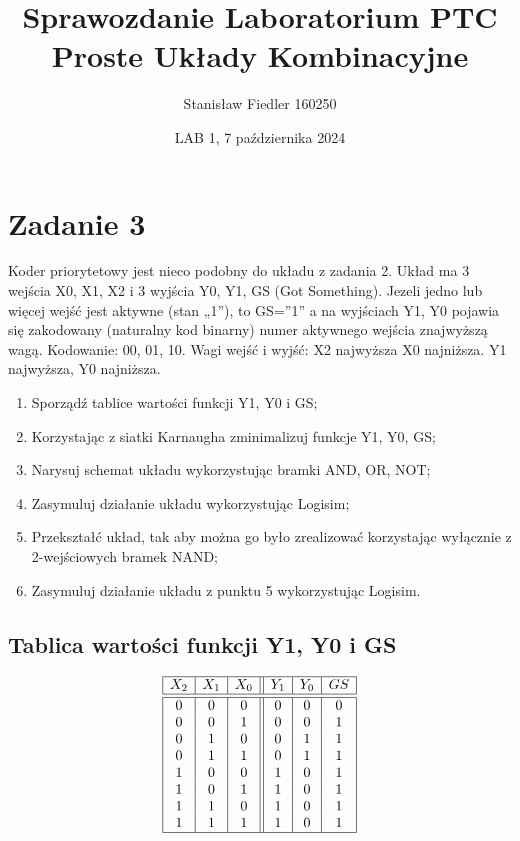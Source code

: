 \documentclass[a4paper, 11pt]{article}
\title{%
       \large Sprawozdanie Laboratorium PTC \\
       \huge Proste Układy Kombinacyjne}
\author{Stanisław Fiedler 160250}
\date{LAB 1, 7 października 2024}
\begin{document}
\maketitle
\tableofcontents

\section{Zadanie 3}
Koder priorytetowy jest nieco podobny do układu z zadania 2.
Układ ma 3 wejścia X0, X1, X2 i 3 wyjścia Y0, Y1, GS (Got Something).
Jezeli jedno lub więcej wejść jest aktywne (stan „1”), to GS=”1” a na wyjściach Y1, Y0 pojawia się zakodowany (naturalny kod binarny) numer aktywnego wejścia znajwyższą wagą. Kodowanie: 00, 01, 10.
Wagi wejść i wyjść: X2 najwyższa X0 najniższa. Y1 najwyższa,
Y0 najniższa.

\begin{enumerate}
	\item Sporządź tablice wartości funkcji Y1, Y0 i GS;
	\item Korzystając z siatki Karnaugha zminimalizuj funkcje Y1, Y0, GS;
	\item Narysuj schemat układu wykorzystując bramki AND, OR, NOT;
	\item Zasymuluj działanie układu wykorzystując Logisim;
	\item Przekształć układ, tak aby można go było zrealizować korzystając wyłącznie z 2-wejściowych
	      bramek NAND;
	\item Zasymuluj działanie układu z punktu 5 wykorzystując Logisim.
\end{enumerate}

\subsection{Tablica wartości funkcji Y1, Y0 i GS}\label{sub:tablicawartosci} %

\begin{center}
	\[
		\begin{array}{ | c | c | c || c | c | c | }
			\hline
			X_2 & X_1 & X_0 & Y_1 & Y_0 & GS \\
			\hline\hline
			0   & 0   & 0   & 0   & 0   & 0  \\
			0   & 0   & 1   & 0   & 0   & 1  \\
			0   & 1   & 0   & 0   & 1   & 1  \\
			0   & 1   & 1   & 0   & 1   & 1  \\
			1   & 0   & 0   & 1   & 0   & 1  \\
			1   & 0   & 1   & 1   & 0   & 1  \\
			1   & 1   & 0   & 1   & 0   & 1  \\
			1   & 1   & 1   & 1   & 0   & 1  \\
			\hline
		\end{array}
	\]
\end{center}
\end{document}
